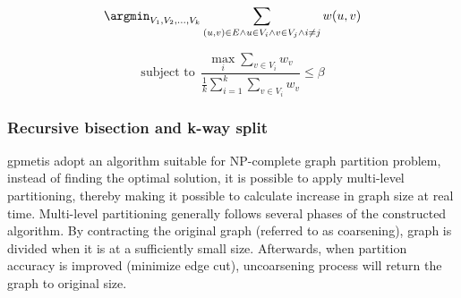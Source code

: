 
{\footnotesize
\begin{equation}
\argmin_{V_1,V_2,\dots,V_k} \sum_{(u,v)\in E \wedge u\in V_i \wedge v\in V_j \wedge i\ne j} w(u,v) \\
\label{eq:gpmetis_problem1}
\end{equation}
}

{\footnotesize
\begin{equation}
\textrm{subject to}\ \ \frac{\max_i \sum_{v\in V_i} w_v}{\frac{1}{k} \sum_{i=1}^k \sum_{v\in V_i} w_v} \le \beta
\label{eq:gpmetis_problem2}
\end{equation}
}






\subsubsection{Recursive bisection and k-way split}
gpmetis adopt an algorithm suitable for NP-complete graph partition problem, instead of finding the optimal solution, it is possible to apply multi-level partitioning, thereby making it possible to calculate increase in graph size at real  time. Multi-level partitioning generally follows several phases of the constructed algorithm.   
By contracting the original graph (referred to as coarsening), graph is divided when it is at a sufficiently small size. Afterwards,  when partition accuracy is improved (minimize edge cut), uncoarsening process will return the graph to original size. 

